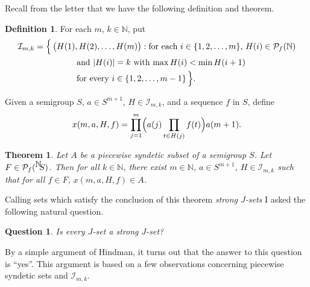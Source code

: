 \documentclass[12pt]{article}
\theoremstyle{plain}
\newtheorem*{thm}{Theorem}
\newtheorem*{ques}{Question}
\theoremstyle{definition}
\newtheorem*{defn}{Definition}
\newcommand{\bbN}{\mathbb{N}}
\newcommand{\calI}{\mathcal{I}}
\newcommand{\Pf}{\mathcal{P}_f}
\newcommand{\setfunc}[2]{\hbox{${}^{\hbox{$#1$}}\hskip -3 pt #2$}}
\begin{document}
Recall from the letter that we have the following definition and theorem.
\begin{defn}
  For each $m$, $k \in \bbN$, put
  \begin{align*}
    \calI_{m,k} &= \Bigl\{\, \bigl(H(1), H(2), \ldots, H(m)\bigr) :
    \mbox{for each $i \in \{1, 2, \ldots, m\}$, $H(i) \in \Pf(\bbN)$}
    \\
    &\hspace{5em}\mbox{and $|H(i)| = k$ with $\max H(i) < \min
      H(i+1)$}\\
    &\hspace{5em}\mbox{for every $i \in \{1, 2, \ldots, m-1\}$} \,\Bigr\}.
  \end{align*}

  Given a semigroup $S$, $a \in S^{m+1}$, $H \in \calI_{m,k}$, and a
  sequence $f$ in $S$, define
  \[
    x(m, a, H, f) = \prod_{j=1}^m\Bigl( a(j)\prod_{t \in H(j)} f(t)
    \Bigr) a(m+1).
  \]
\end{defn}

\begin{thm}
  Let $A$ be a piecewise syndetic subset of a semigroup $S$. 
  Let $F \in \Pf(\setfunc{\bbN}{S})$.
  Then for all $k \in \bbN$, there exist $m \in \bbN$, $a \in
  S^{m+1}$, $H \in \calI_{m,k}$ such that for all $f \in F$, $x(m, a,
  H, f) \in A$.
\end{thm}

Calling sets which satisfy the conclusion of this theorem
\textsl{strong $J$-sets} I asked the following natural question.

\begin{ques}
  Is every $J$-set a strong $J$-set?
\end{ques}

By a simple argument of Hindman, it turns out that the answer to this
question is ``yes''.
This argument is based on a few observations concerning piecewise
syndetic sets and $\calI_{m,k}$.
\end{document}
